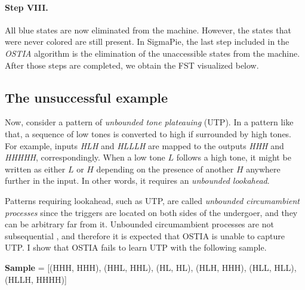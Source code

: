 \paragraph{Step VIII.}

All blue states are now eliminated from the machine.
However, the states that were never colored are still present.
In SigmaPie, the last step included in the \emph{OSTIA} algorithm is the elimination of the unaccessible states from the machine.
After those steps are completed, we obtain the FST visualized below.%

\begin{center}
\end{center}


\subsection{The unsuccessful example}
\label{exam2}

Now, consider a pattern of \emph{unbounded tone plateauing} (UTP).
In a pattern like that, a sequence of low tones is converted to high if surrounded by high tones.
For example, inputs \emph{HLH} and \emph{HLLLH} are mapped to the outputs \emph{HHH} and \emph{HHHHH}, correspondingly.
When a low tone $L$ follows a high tone, it might be written as either $L$ or $H$ depending on the presence of another $H$ anywhere further in the input.
In other words, it requires an \emph{unbounded lookahead}.

Patterns requiring lookahead, such as UTP, are called \emph{unbounded circumambient processes} since the triggers are located on both sides of the undergoer, and they can be arbitrary far from it.
Unbounded circumambient processes are not subsequential \citep{Jardine2016}, and therefore it is expected that OSTIA is unable to capture UTP.
I show that OSTIA fails to learn UTP with the following sample.

\textbf{Sample} = {[}(HHH, HHH), (HHL, HHL), (HL, HL), (HLH, HHH), (HLL, HLL), (HLLH, HHHH){]}

